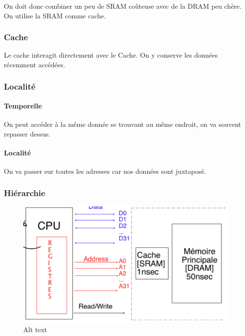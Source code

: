 On doit donc combiner un peu de SRAM coûteuse avec de la DRAM peu chère.
On utilise la SRAM comme cache.

\subsubsection{Cache}\label{cache}

Le cache interagit directement avec le Cache. On y conserve les données
récemment accédées.

\subsubsection{Localité}\label{localituxe9}

\paragraph{Temporelle}\label{temporelle}

On peut accéder à la même donnée se trouvant au même endroit, on va
souvent repasser dessus.

\paragraph{Localité}\label{localituxe9-1}

On va passer sur toutes les adresses car nos données sont juxtaposé.

\subsubsection{Hiérarchie}\label{hiuxe9rarchie}

\begin{figure}
\centering
\includegraphics{image-11.png}
\caption{Alt text}
\end{figure}

